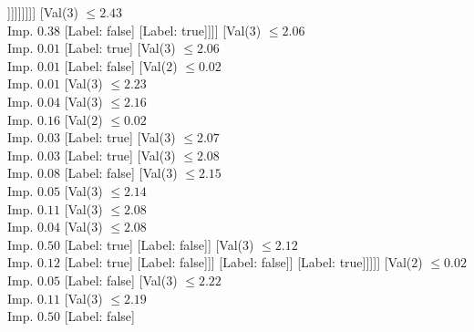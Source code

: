 \documentclass[margin=10pt]{standalone}
\begin{document}
\begin{forest}
															[Label: false]
															[Val($3$) $ \leq 2.57$ \\ Imp. $0.08$
																[Label: true]
																[Val($3$) $ \leq 2.59$ \\ Imp. $0.18$
																	[Label: false]
																	[Val($3$) $ \leq 2.61$ \\ Imp. $0.12$
																		[Label: true]
																		[Val($3$) $ \leq 2.64$ \\ Imp. $0.50$
																			[Label: false]
																			[Label: true]]]]]]]]]
											[Val($3$) $ \leq 2.43$ \\ Imp. $0.38$
												[Label: false]
												[Label: true]]]]
									[Val($3$) $ \leq 2.06$ \\ Imp. $0.01$
										[Label: true]
										[Val($3$) $ \leq 2.06$ \\ Imp. $0.01$
											[Label: false]
											[Val($2$) $ \leq 0.02$ \\ Imp. $0.01$
												[Val($3$) $ \leq 2.23$ \\ Imp. $0.04$
													[Val($3$) $ \leq 2.16$ \\ Imp. $0.16$
														[Val($2$) $ \leq 0.02$ \\ Imp. $0.03$
															[Label: true]
															[Val($3$) $ \leq 2.07$ \\ Imp. $0.03$
																[Label: true]
																[Val($3$) $ \leq 2.08$ \\ Imp. $0.08$
																	[Label: false]
																	[Val($3$) $ \leq 2.15$ \\ Imp. $0.05$
																		[Val($3$) $ \leq 2.14$ \\ Imp. $0.11$
																			[Val($3$) $ \leq 2.08$ \\ Imp. $0.04$
																				[Val($3$) $ \leq 2.08$ \\ Imp. $0.50$
																					[Label: true]
																					[Label: false]]
																				[Val($3$) $ \leq 2.12$ \\ Imp. $0.12$
																					[Label: true]
																					[Label: false]]]
																			[Label: false]]
																		[Label: true]]]]]
														[Val($2$) $ \leq 0.02$ \\ Imp. $0.05$
															[Label: false]
															[Val($3$) $ \leq 2.22$ \\ Imp. $0.11$
																[Val($3$) $ \leq 2.19$ \\ Imp. $0.50$
																	[Label: false]

\end{forest}
\end{document}
